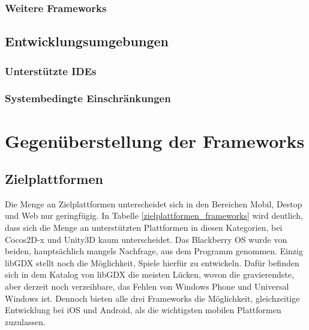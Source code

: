 \subsection{Weitere Frameworks}
\section{Entwicklungsumgebungen}
\subsection{Unterstützte IDEs}
\subsection{Systembedingte Einschränkungen}

\chapter{Gegenüberstellung der Frameworks}


\section{Zielplattformen}
Die Menge an Zielplattformen unterscheidet sich in den Bereichen Mobil, Destop und Web nur geringfügig. In Tabelle \ref{zielplattformen_frameworks} wird deutlich, dass sich die Menge an unterstützten Plattformen in diesen Kategorien, bei Cocos2D-x und Unity3D kaum unterscheidet. Das Blackberry OS wurde von beiden, hauptsächlich mangels Nachfrage, aus dem Programm genommen. Einzig libGDX stellt noch die Möglichkeit, Spiele hierfür zu entwickeln. Dafür befinden sich in dem Katalog von libGDX die meisten Lücken, wovon die gravierendste, aber derzeit noch verzeihbare, das Fehlen von Windows Phone und Universal Windows ist. Dennoch bieten alle drei Frameworks die Möglichkeit, gleichzeitige Entwicklung bei iOS und Android, als die wichtigsten mobilen Plattformen zuzulassen. 

